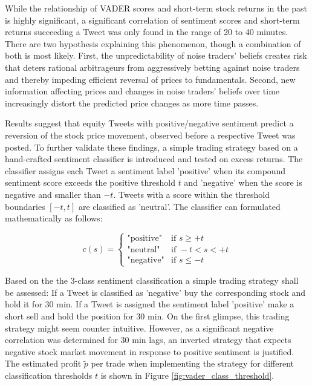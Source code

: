 \documentclass[a4paper,12pt]{article}%
\begin{document}
While the relationship of VADER scores and short-term stock returns in the past is highly significant, a significant correlation of sentiment scores and short-term returns succeeding a Tweet was only found in the range of 20 to 40 minutes. There are two hypothesis explaining this phenomenon, though a combination of both is most likely. First, the unpredictability of noise traders' beliefs creates risk that deters rational arbitrageurs from aggressively betting against noise traders \citep{DeLong1990} and thereby impeding efficient reversal of prices to fundamentals. Second, new information affecting prices and changes in noise traders' beliefs over time increasingly distort the predicted price changes as more time passes.

%
%

Results suggest that equity Tweets with positive/negative sentiment predict a reversion of the stock price movement, observed before a respective Tweet was posted. To further validate these findings, a simple trading strategy based on a hand-crafted sentiment classifier is introduced and tested on excess returns. The classifier assigns each Tweet a sentiment label 'positive' when its compound sentiment score exceeds the positive threshold $t$ and 'negative' when the score is negative and smaller than $-t$. Tweets with a score within the threshold boundaries $[-t,t]$ are classified as 'neutral'. The classifier can formulated mathematically as follows:

\begin{equation}
 c(s) =
   \begin{cases}
     \text{"positive"} & \text{if } s \geq +t\\
     \text{"neutral"}  & \text{if } -t < s < +t \\
     \text{"negative"}  & \text{if } s \leq -t
   \end{cases}
\end{equation}

Based on the the 3-class sentiment classification a simple trading strategy shall be assessed: If a Tweet is classified as 'negative' buy the corresponding stock and hold it for 30 min. If a Tweet is assigned the sentiment label 'positive' make a short sell and hold the position for 30 min. On the first glimpse, this trading strategy might seem counter intuitive. However, as a significant negative correlation was determined for 30 min lags, an inverted strategy that expects negative stock market movement in response to positive sentiment is justified. The estimated profit $\tilde{p}$ per trade when implementing the strategy for different classification thresholds $t$ is shown in Figure \ref{fig:vader_class_threshold}.
\end{document}
